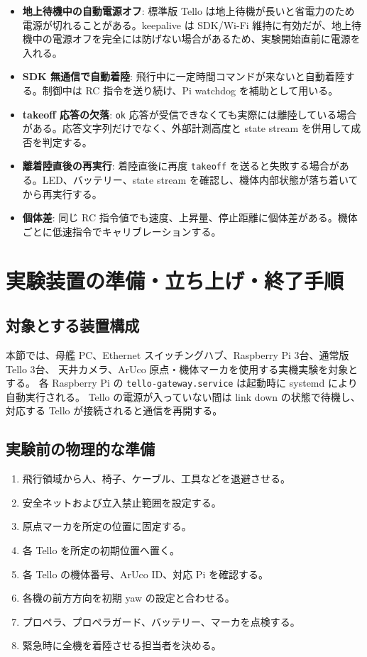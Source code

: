 \documentclass[11pt,a4paper]{ltjsarticle}
\newcommand{\code}[1]{\texttt{\small #1}}
\begin{document}
\begin{itemize}[leftmargin=1.4em]
  \item \textbf{地上待機中の自動電源オフ}: 標準版 Tello は地上待機が長いと省電力のため電源が切れることがある。keepalive は SDK/Wi-Fi 維持に有効だが、地上待機中の電源オフを完全には防げない場合があるため、実験開始直前に電源を入れる。
  \item \textbf{SDK 無通信で自動着陸}: 飛行中に一定時間コマンドが来ないと自動着陸する。制御中は RC 指令を送り続け、Pi watchdog を補助として用いる。
  \item \textbf{takeoff 応答の欠落}: \code{ok} 応答が受信できなくても実際には離陸している場合がある。応答文字列だけでなく、外部計測高度と state stream を併用して成否を判定する。
  \item \textbf{離着陸直後の再実行}: 着陸直後に再度 \code{takeoff} を送ると失敗する場合がある。LED、バッテリー、state stream を確認し、機体内部状態が落ち着いてから再実行する。
  \item \textbf{個体差}: 同じ RC 指令値でも速度、上昇量、停止距離に個体差がある。機体ごとに低速指令でキャリブレーションする。
\end{itemize}

\section{実験装置の準備・立ち上げ・終了手順}
\label{sec:experiment_startup}

\subsection{対象とする装置構成}

本節では、母艦 PC、Ethernet スイッチングハブ、Raspberry Pi 3台、通常版 Tello 3台、
天井カメラ、ArUco 原点・機体マーカを使用する実機実験を対象とする。
各 Raspberry Pi の \code{tello-gateway.service} は起動時に systemd により自動実行される。
Tello の電源が入っていない間は link down の状態で待機し、対応する Tello が接続されると通信を再開する。

\subsection{実験前の物理的な準備}

\begin{enumerate}[leftmargin=1.6em]
  \item 飛行領域から人、椅子、ケーブル、工具などを退避させる。
  \item 安全ネットおよび立入禁止範囲を設定する。
  \item 原点マーカを所定の位置に固定する。
  \item 各 Tello を所定の初期位置へ置く。
  \item 各 Tello の機体番号、ArUco ID、対応 Pi を確認する。
  \item 各機の前方方向を初期 yaw の設定と合わせる。
  \item プロペラ、プロペラガード、バッテリー、マーカを点検する。
  \item 緊急時に全機を着陸させる担当者を決める。
\end{enumerate}
\end{document}
